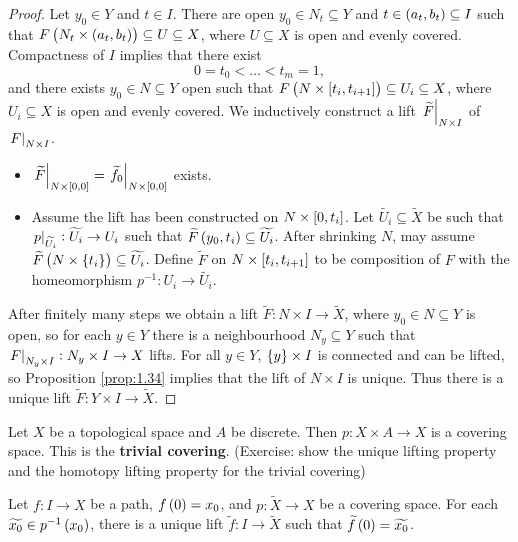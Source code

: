 \begin{proof}
Let $ y_0 \in Y $ and $ t \in I $. There are open $ y_0 \in N_t \subseteq Y $ and $ t \in \br{a_t, b_t} \subseteq I $ such that $ F\br{N_t \times \br{a_t, b_t}} \subseteq U \subseteq X $, where $ U \subseteq X $ is open and evenly covered. Compactness of $ I $ implies that there exist
$$ 0 = t_0 < \dots < t_m = 1, $$
and there exists $ y_0 \in N \subseteq Y $ open such that $ F\br{N \times \sbr{t_i, t_{i + 1}}} \subseteq U_i \subseteq X $, where $ U_i \subseteq X $ is open and evenly covered. We inductively construct a lift $ \left. \widetilde{F} \right|_{N \times I} $ of $ \left. F \right|_{N \times I} $.
\begin{itemize}
\item $ \eval{\widetilde{F}}_{N \times \sbr{0, 0}} = \eval{\widetilde{f_0}}_{N \times \sbr{0, 0}} $ exists.
\item Assume the lift has been constructed on $ N \times \sbr{0, t_i} $. Let $ \widetilde{U_i} \subseteq \widetilde{X} $ be such that $ \left. p \right|_{\widetilde{U_i}} : \widetilde{U_i} \to U_i $ such that $ \widetilde{F}\br{y_0, t_i} \subseteq \widetilde{U_i} $. After shrinking $ N $, may assume $ \widetilde{F}\br{N \times \cbr{t_i}} \subseteq \widetilde{U_i} $. Define $ \widetilde{F} $ on $ N \times \sbr{t_i, t_{i + 1}} $ to be composition of $ F $ with the homeomorphism $ p^{-1} : U_i \to \widetilde{U_i} $.
\end{itemize}
After finitely many steps we obtain a lift $ \widetilde{F} : N \times I \to \widetilde{X} $, where $ y_0 \in N \subseteq Y $ is open, so for each $ y \in Y $ there is a neighbourhood $ N_y \subseteq Y $ such that $ \left. F \right|_{N_y \times I} : N_y \times I \to X $ lifts. For all $ y \in Y $, $ \cbr{y} \times I $ is connected and can be lifted, so Proposition \ref{prop:1.34} implies that the lift of $ N \times I $ is unique. Thus there is a unique lift $ \widetilde{F} : Y \times I \to \widetilde{X} $.
\end{proof}

\begin{example*}
Let $ X $ be a topological space and $ A $ be discrete. Then $ p : X \times A \to X $ is a covering space. This is the \textbf{trivial covering}. (Exercise: show the unique lifting property and the homotopy lifting property for the trivial covering)
\end{example*}

\begin{corollary}
Let $ f : I \to X $ be a path, $ f\br{0} = x_0 $, and $ p : \widetilde{X} \to X $ be a covering space. For each $ \widetilde{x_0} \in p^{-1}\br{x_0} $, there is a unique lift $ \widetilde{f} : I \to \widetilde{X} $ such that $ \widetilde{f}\br{0} = \widetilde{x_0} $.
\end{corollary}

